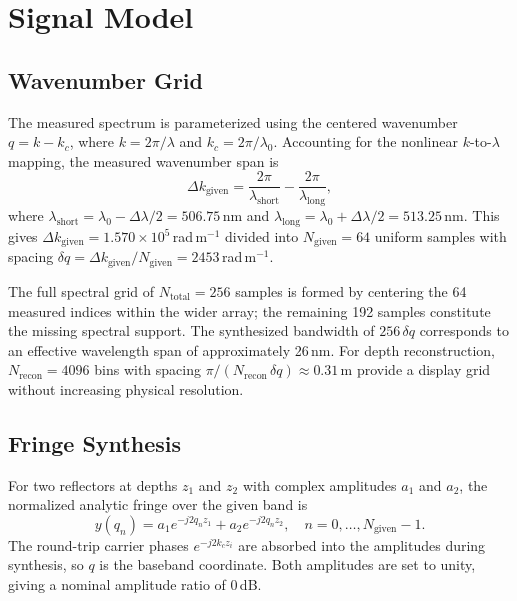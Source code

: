 \documentclass[conference]{IEEEtran}
\begin{document}
\section{Signal Model}

\subsection{Wavenumber Grid}

The measured spectrum is parameterized using the centered wavenumber
$q = k - k_c$, where $k = 2\pi/\lambda$ and $k_c = 2\pi/\lambda_0$.
Accounting for the nonlinear $k$-to-$\lambda$ mapping, the measured
wavenumber span is
\begin{equation}
  \Delta k_\text{given}
  = \frac{2\pi}{\lambda_\text{short}}
  - \frac{2\pi}{\lambda_\text{long}},
\end{equation}
where $\lambda_\text{short} = \lambda_0 - \Delta\lambda/2 = 506.75$\,nm
and $\lambda_\text{long} = \lambda_0 + \Delta\lambda/2 = 513.25$\,nm.
This gives $\Delta k_\text{given} = 1.570\times10^5$\,rad\,m$^{-1}$
divided into $N_\text{given} = 64$ uniform samples with spacing
$\delta q = \Delta k_\text{given}/N_\text{given} = 2453$\,rad\,m$^{-1}$.

The full spectral grid of $N_\text{total} = 256$ samples is formed by
centering the 64 measured indices within the wider array; the remaining
192 samples constitute the missing spectral support. The synthesized
bandwidth of $256\,\delta q$ corresponds to an effective wavelength
span of approximately 26\,nm. For depth reconstruction, $N_\text{recon}
= 4096$ bins with spacing $\pi/(N_\text{recon}\,\delta q) \approx
0.31$\,\textmu m provide a display grid without increasing physical
resolution.

\subsection{Fringe Synthesis}

For two reflectors at depths $z_1$ and $z_2$ with complex amplitudes
$a_1$ and $a_2$, the normalized analytic fringe over the given band is
\begin{equation}
  y(q_n) = a_1 e^{-j2q_n z_1} + a_2 e^{-j2q_n z_2},
  \quad n = 0,\ldots,N_\text{given}-1.
  \label{eq:fringe}
\end{equation}
The round-trip carrier phases $e^{-j2k_c z_i}$ are absorbed into the
amplitudes during synthesis, so $q$ is the baseband coordinate. Both
amplitudes are set to unity, giving a nominal amplitude ratio of 0\,dB.
\end{document}

